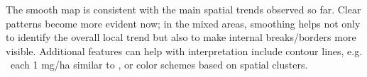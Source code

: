 \documentclass[12pt]{article}
\begin{document}
The smooth map is consistent with
the main spatial trends observed so far. Clear patterns become more
evident now; in the mixed areas, smoothing helps not only to identify
the overall local trend but also to make internal breaks/borders more
visible. Additional features can help with interpretation include
contour lines, e.g. \ each 1 mg/ha similar to \cite{Blackmore1999}, or
color schemes based on spatial clusters.

\end{document}
